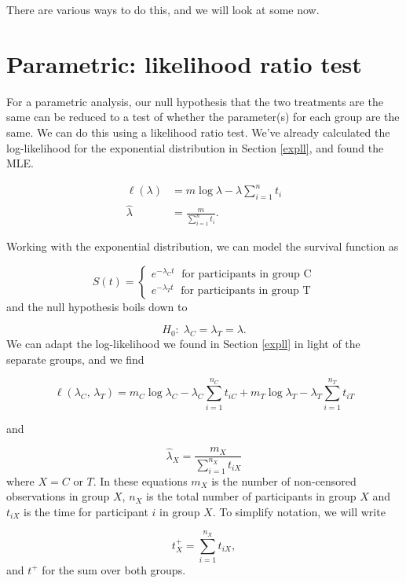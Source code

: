 \documentclass[
  openany]{book}
\theoremstyle{definition}
\theoremstyle{definition}
\theoremstyle{definition}
\theoremstyle{definition}
\theoremstyle{remark}
\begin{document}
There are various ways to do this, and we will look at some now.

\hypertarget{survlrtest}{%
\section{Parametric: likelihood ratio test}\label{survlrtest}}

For a parametric analysis, our null hypothesis that the two treatments are the same can be reduced to a test of whether the parameter(s) for each group are the same. We can do this using a likelihood ratio test. We've already calculated the log-likelihood for the exponential distribution in Section \ref{expll}, and found the MLE.

\begin{align*}
\ell\left(\lambda\right) & = m\log\lambda - \lambda\sum\limits_{i=1}^n t_i\\
\hat{\lambda} & = \frac{m}{\sum\limits_{i=1}^n t_i}.
\end{align*}

Working with the exponential distribution, we can model the survival function as

\[S\left(t\right) = 
\begin{cases}
e^{-\lambda_Ct}\; \text{ for participants in group C}\\
e^{-\lambda_Tt}\; \text{ for participants in group T}
\end{cases}
\]
and the null hypothesis boils down to

\[H_0: \; \lambda_C = \lambda_T = \lambda. \]
We can adapt the log-likelihood we found in Section \ref{expll} in light of the separate groups, and we find

\begin{equation}
\ell\left(\lambda_C,\,\lambda_T\right) = m_C\log\lambda_C - \lambda_C\sum\limits_{i=1}^{n_C}t_{iC} + m_T\log\lambda_T - \lambda_T\sum\limits_{i=1}^{n_T}t_{iT}  
\label{eq:llsurv1}
\end{equation}

and

\[\hat{\lambda}_X = \frac{m_X}{\sum\limits_{i=1}^{n_X}t_{iX}}\]
where \(X=C\) or \(T\). In these equations \(m_X\) is the number of non-censored observations in group \(X\), \(n_X\) is the total number of participants in group \(X\) and \(t_{iX}\) is the time for participant \(i\) in group \(X\). To simplify notation, we will write

\[t^+_X = \sum\limits_{i=1}^{n_X}t_{iX},\]
and \(t^+\) for the sum over both groups.
\end{document}
